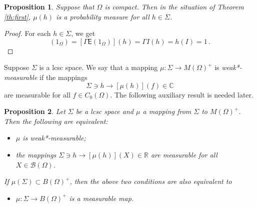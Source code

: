 \documentclass[12pt]{amsart}
\newtheorem{proposition}{Proposition}
\theoremstyle{definition}
\newcommand{\R}{\mathbb R} %
\newcommand{\C}{\mathbb C} %
\newcommand{\Eo}{\mathsf{E}} %
\newcommand{\bor}[1]{\mathcal{B}(#1)} %
\newcommand{\frecc}{\rightarrow}
\begin{document}
\begin{proposition}\label{prop:compact}
Suppose that $\Omega$ is compact. Then in the situation of Theorem \ref{th:first}, $\mu (h)$ is a probability measure for all $h\in\Sigma$.
\end{proposition}

\begin{proof}
For each $h\in\Sigma$, we get
\begin{equation*}
[\mu(h)](1_{\Omega}) = [\Gamma \Eo(1_{\Omega})](h) = \Gamma I(h)=h(I)=1 \, .
\end{equation*}
\end{proof}


Suppose $\Sigma$ is a lcsc space. We say that a mapping $\mu : \Sigma \frecc M(\Omega)^+$ is {\em weak*-measurable} if the mappings
\begin{equation*}
\Sigma \ni h \to [\mu (h)] (f) \in \C
\end{equation*}
are measurable for all $f\in C_0 (\Omega)$. The following auxiliary result is needed later.

\begin{proposition}\label{misMark}
Let $\Sigma$ be a lcsc space and $\mu$ a mapping from $\Sigma$ to $M(\Omega)^+$. Then the following are equivalent:
\begin{itemize}
\item[(a)] $\mu$ is  weak*-measurable;
\item[(b)] the mappings $\Sigma \ni h \to [\mu (h)] (X) \in \R$ are measurable for all $X\in \bor{\Omega}$.
\end{itemize}
If $\mu(\Sigma) \subset B(\Omega)^+$, then the above two conditions are also equivalent to
\begin{itemize}
\item[(c)] $\mu : \Sigma \frecc B(\Omega)^+$ is a measurable map.
\end{itemize}
\end{proposition}
\end{document}
